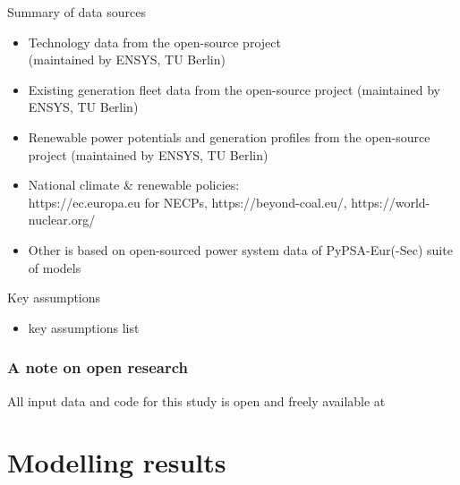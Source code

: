 \begin{frame}{Summary of data sources}

  \begin{itemize}
\item Technology data from the open-source  project \\ (maintained by ENSYS, TU Berlin)
\item Existing generation fleet data from the open-source  project (maintained by ENSYS, TU Berlin)
\item Renewable power potentials and generation profiles from the open-source  project (maintained by ENSYS, TU Berlin)
\item National climate \& renewable policies:  \\ https://ec.europa.eu for NECPs, https://beyond-coal.eu/, https://world-nuclear.org/
\item Other is based on open-sourced power system data of PyPSA-Eur(-Sec) suite of models 
  \end{itemize}

\end{frame}


\begin{frame}{Key assumptions}

  \begin{itemize}
\item key assumptions list
  \end{itemize}

\end{frame}


\begin{frame}
  \frametitle{A note on open research}

  \centering
  All input data and code for this study is open and freely available at \\

  \vspace{.3cm}

\end{frame}


\section{Modelling results}



